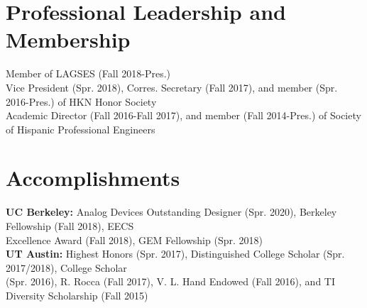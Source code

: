 \documentclass[letter]{res}
\begin{document}
\begin{resume}
\vspace{-8.5mm}

\section{Professional Leadership and Membership}
Member of LAGSES (Fall 2018-Pres.)\\
Vice President (Spr. 2018), Corres. Secretary (Fall 2017), and member (Spr. 2016-Pres.) of HKN Honor Society\\
Academic Director (Fall 2016-Fall 2017), and member (Fall 2014-Pres.) of Society of Hispanic Professional Engineers\\

\vspace{-8.5mm}

\section{Accomplishments}

\textbf{UC Berkeley:} Analog Devices Outstanding Designer (Spr. 2020), Berkeley Fellowship (Fall 2018), EECS \\
Excellence Award (Fall 2018), GEM Fellowship (Spr. 2018) \\
\textbf{UT Austin:} Highest Honors (Spr. 2017), Distinguished College Scholar (Spr. 2017/2018), College Scholar \\
(Spr. 2016), R. Rocca (Fall 2017), V. L. Hand Endowed (Fall 2016), and TI Diversity Scholarship (Fall 2015)

\end{resume}
\end{document}
